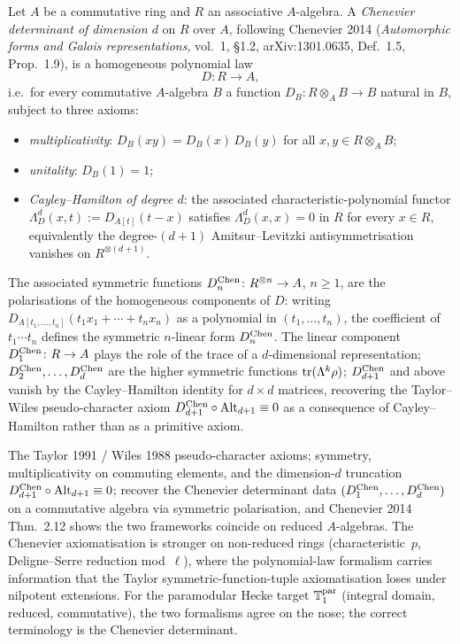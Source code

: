 \begin{definition}
\label{def:dl-chenevier-pseudocharacter}
Let $A$ be a commutative ring and $R$ an associative $A$-algebra.
A \emph{Chenevier determinant of dimension $d$} on $R$ over $A$,
following Chenevier 2014 (\emph{Automorphic forms and Galois
representations}, vol.~1, \S1.2, arXiv:1301.0635, Def.~1.5,
Prop.~1.9), is a homogeneous polynomial law
\[
 D\colon R\longrightarrow A,
\]
i.e.\ for every commutative $A$-algebra $B$ a function
$D_B\colon R\otimes_A B\to B$ natural in $B$, subject to three axioms:
\begin{itemize}
 \item \emph{multiplicativity}: $D_B(xy) = D_B(x)\,D_B(y)$ for all
 $x,y\in R\otimes_A B$;
 \item \emph{unitality}: $D_B(1) = 1$;
 \item \emph{Cayley--Hamilton of degree $d$}: the associated
 characteristic-polynomial functor $\Lambda^d_D(x,t) := D_{A[t]}(t-x)$
 satisfies $\Lambda^d_D(x,x) = 0$ in $R$ for every $x\in R$,
 equivalently the degree-$(d+1)$ Amitsur--Levitzki
 antisymmetrisation vanishes on $R^{\otimes(d+1)}$.
\end{itemize}
The associated symmetric functions
$D^{\mathrm{Chen}}_n\colon R^{\otimes n}\to A$, $n\ge 1$, are the polarisations of
the homogeneous components of $D$: writing
$D_{A[t_1,\dots,t_n]}(t_1 x_1 + \cdots + t_n x_n)$ as a polynomial in
$(t_1,\dots,t_n)$, the coefficient of $t_1\cdots t_n$ defines the
symmetric $n$-linear form $D^{\mathrm{Chen}}_n$. The linear component
$D^{\mathrm{Chen}}_1\colon R\to A$ plays the role of the trace of a $d$-dimensional
representation; $D^{\mathrm{Chen}}_2,\dots,D^{\mathrm{Chen}}_d$ are the higher symmetric
functions $\operatorname{tr}(\Lambda^k\rho)$; $D^{\mathrm{Chen}}_{d+1}$ and above vanish by the
Cayley--Hamilton identity for $d\times d$ matrices, recovering the
Taylor--Wiles pseudo-character axiom
$D^{\mathrm{Chen}}_{d+1}\circ\mathrm{Alt}_{d+1}\equiv 0$ as a consequence of
Cayley--Hamilton rather than as a primitive axiom.
\end{definition}

\begin{remark}
\label{rem:dl-chenevier-axiom-comparison}
The Taylor 1991 / Wiles 1988 pseudo-character axioms; symmetry,
multiplicativity on commuting elements, and the dimension-$d$
truncation $D^{\mathrm{Chen}}_{d+1}\circ\mathrm{Alt}_{d+1}\equiv 0$; recover the
Chenevier determinant data $(D^{\mathrm{Chen}}_1,\dots,D^{\mathrm{Chen}}_d)$ on a commutative
algebra via symmetric polarisation, and Chenevier 2014 Thm.~2.12
shows the two frameworks coincide on reduced $A$-algebras. The
Chenevier axiomatisation is stronger on non-reduced rings
(characteristic~$p$, Deligne--Serre reduction mod~$\ell$), where the
polynomial-law formalism carries information that the Taylor
symmetric-function-tuple axiomatisation loses under nilpotent
extensions. For the paramodular Hecke target $\mathbb{T}^{\mathrm{par}}_1$
(integral domain, reduced, commutative), the two formalisms agree
on the nose; the correct terminology is the Chenevier
determinant.
\end{remark}

